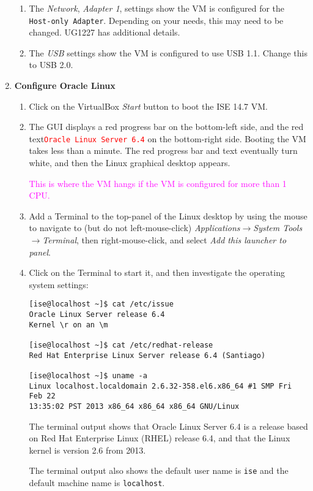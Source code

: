 \begin{enumerate}
\begin{enumerate}
\item The \emph{Network}, \emph{Adapter 1}, settings show the VM is configured
for the \verb+Host-only Adapter+. Depending on your needs, this may need to be
changed. UG1227 has additional details.
\item The \emph{USB} settings show the VM is configured to use USB 1.1.
Change this to USB 2.0.
\end{enumerate}
%
\newpage
\item \textbf{Configure Oracle Linux}
%
\begin{enumerate}
\item Click on the VirtualBox \emph{Start} button to boot the ISE 14.7 VM.
\item The GUI displays a red progress bar on the bottom-left side, and the
red text\newline \textcolor{red}{\texttt{Oracle Linux Server 6.4}} on the bottom-right side.
Booting the VM takes less than a minute. The red progress bar and text eventually turn white,
and then the Linux graphical desktop appears.

\textcolor{magenta}{This is where the VM hangs if the VM is configured for more than 1 CPU.}

\item Add a Terminal to the top-panel of the Linux desktop by using the mouse to navigate
to (but do not left-mouse-click) \emph{Applications$\rightarrow$System Tools$\rightarrow$Terminal}, 
then right-mouse-click, and select \emph{Add this launcher to panel}.

\item Click on the Terminal to start it, and then investigate the operating system settings:
%
\begin{verbatim}
[ise@localhost ~]$ cat /etc/issue
Oracle Linux Server release 6.4
Kernel \r on an \m

[ise@localhost ~]$ cat /etc/redhat-release 
Red Hat Enterprise Linux Server release 6.4 (Santiago)

[ise@localhost ~]$ uname -a
Linux localhost.localdomain 2.6.32-358.el6.x86_64 #1 SMP Fri Feb 22 
13:35:02 PST 2013 x86_64 x86_64 x86_64 GNU/Linux
\end{verbatim}
The terminal output shows that Oracle Linux Server 6.4 is a release based on 
Red Hat Enterprise Linux (RHEL) release 6.4, and that the Linux kernel is 
version 2.6 from 2013.

The terminal output also shows the default user name is \verb+ise+ and the default 
machine name is \verb+localhost+.


\end{enumerate}
\end{enumerate}
